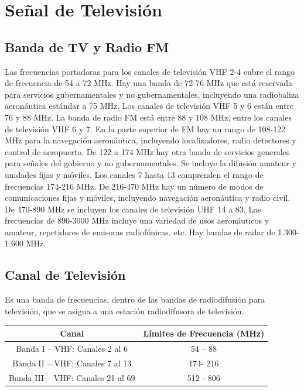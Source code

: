 \chapter{Señal de Televisión}

\section{Banda de TV y Radio FM}
Las frecuencias portadoras para los canales de televisión VHF 2-4 cubre el rango de frecuencia de 54 a 72 MHz. Hay una banda de 72-76 MHz que está reservada para servicios gubernamentales y no gubernamentales, incluyendo una radiobaliza aeronáutica estándar a 75 MHz. Los canales de televisión VHF 5 y 6 están entre 76 y 88 MHz. La banda de radio FM está entre 88 y 108 MHz, entre los canales de televisión VHF 6 y 7. En la parte superior de FM hay un rango de 108-122 MHz para la navegación aeronáutica, incluyendo localizadores, radio detectores y control de aeropuerto. De 122 a 174 MHz hay otra banda de servicios generales para señales del gobierno y no gubernamentales. Se incluye la difusión amateur y unidades fijas y móviles. Los canales 7 hasta 13 comprenden el rango de frecuencias 174-216 MHz. De 216-470 MHz hay un número de modos de comunicaciones fijas y móviles, incluyendo navegación aeronáutica y radio civil. De 470-890 MHz se incluyen los canales de televisión UHF 14 a 83. Las frecuencias de 890-3000 MHz incluye una variedad de usos aeronáuticos y amateur, repetidores de emisoras radiofónicas, etc. Hay bandas de radar de 1.300-1.600 MHz.

\section{Canal de Televisión}
Es una banda de frecuencias, dentro de las bandas de radiodifusión para televisión, que se asigna a una estación radiodifusora de televisión.

\begin{table}[ht]
    \begin{center}
        \begin{tabular}{|c|c|}
            \hline
            Canal	&Límites de Frecuencia (MHz)\\
            \hline
            Banda I – VHF: Canales 2 al 6	&54 – 88\\
            Banda II – VHF: Canales 7 al 13	&174- 216\\
            Banda III – VHF: Canales 21 al 69	&512 - 806\\
            \hline
        \end{tabular}
    \end{center}
\end{table}

